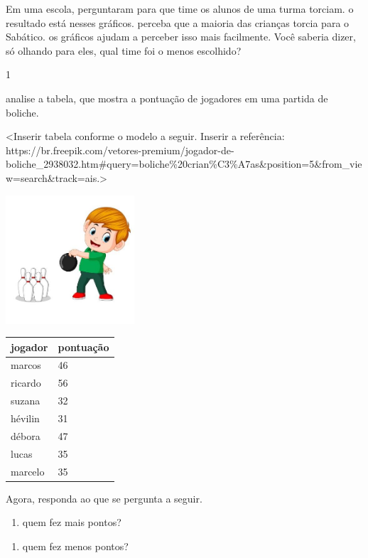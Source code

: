 Em uma escola, perguntaram para que time os alunos de uma turma torciam. o
resultado está nesses gráficos. perceba que a maioria das crianças
torcia para o Sabático. os gráficos ajudam a perceber isso mais facilmente. Você saberia dizer, só olhando para eles, qual time foi o menos escolhido?


\num{1}

analise a tabela, que mostra a pontuação de jogadores em uma partida de
boliche.

\textless{}Inserir tabela conforme o modelo a seguir. Inserir a
referência:
https://br.freepik.com/vetores-premium/jogador-de-boliche\_2938032.htm\#query=boliche\%20crian\%C3\%A7as\&position=5\&from\_view=search\&track=ais.\textgreater{}

\includegraphics[width=1.88542in,height=1.88542in]{media/image95.jpg}

\begin{longtable}[]{@{}ll@{}}
\toprule
jogador & pontuação\tabularnewline
\midrule
\endhead
marcos & 46\tabularnewline
ricardo & 56\tabularnewline
suzana & 32\tabularnewline
hévilin & 31\tabularnewline
débora & 47\tabularnewline
lucas & 35\tabularnewline
marcelo & 35\tabularnewline
\bottomrule
\end{longtable}

Agora, responda ao que se pergunta a seguir.

\begin{enumerate}
\def\labelenumi{\Alph{enumi})}
\item
  quem fez mais pontos?
\end{enumerate}


\begin{enumerate}
\def\labelenumi{\Alph{enumi})}
\item
  quem fez menos pontos?
\end{enumerate}


